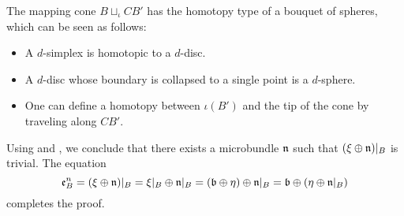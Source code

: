 \begin{myproof}
\begin{steps}
The mapping cone $B \sqcup_\iota CB'$ has the homotopy type of a bouquet of spheres, which can be seen as follows: \begin{itemize} \item A $d$-simplex is homotopic to a $d$-disc. \item A $d$-disc whose boundary is collapsed to a single point is a $d$-sphere. \item One can define a homotopy between $\iota(B')$ and the tip of the cone by traveling along $CB'$. \end{itemize}

Using  and , we conclude that there exists a microbundle $\mathfrak{n}$ such that $(\xi \oplus{} \mathfrak{n})\vert_{B}$ is trivial. The equation \[ \be{B} = (\whitney{\xi}{\bn})\restr{B} = \whitney{\xi\restr{B}}{\bn\restr{B}} = \whitney{(\whitney{\bb}{\eta})}{\bn\restr{B}} = \whitney{\bb}{(\whitney{\eta}{\bn\restr{B}})} \] completes the proof. \end{steps} \end{myproof}